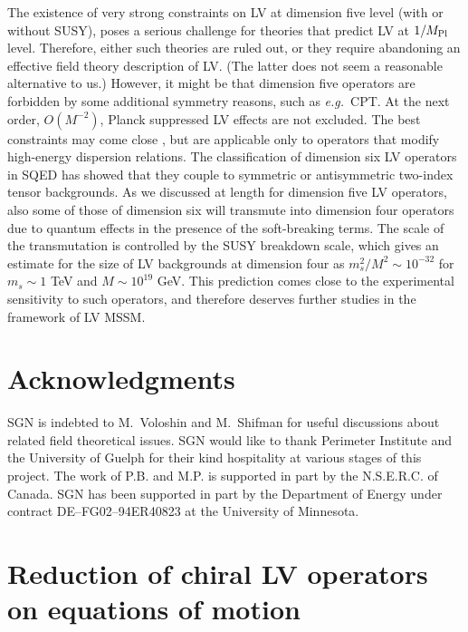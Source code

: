 \documentclass[12pt]{revtex4}
\begin{document}
The existence of very strong constraints on LV at dimension five level
(with or without SUSY), poses a serious challenge for theories that
predict LV at $1/M_{\rm Pl}$ level. Therefore, either such theories are
ruled out, or they require abandoning an effective field theory
description of LV. (The latter does not seem a  reasonable alternative
to us.) However, it might be that dimension five operators are
forbidden by some additional symmetry reasons, such as {\em e.g.}\
CPT. At the next order, $O(M^{-2})$, Planck suppressed LV effects 
are not excluded. The best constraints may come close
\cite{Gagnon:2004xh},  but are applicable only to operators that
modify high-energy dispersion relations. The classification of
dimension six LV operators in SQED has showed that they  couple to
symmetric or antisymmetric two-index tensor backgrounds. 
As we discussed at length for dimension five LV operators, also some
of those of dimension six will transmute into dimension four operators
due to quantum effects in the presence of the soft-breaking
terms. The scale of the transmutation is controlled by the
SUSY breakdown scale, which gives an estimate for the size of  
LV backgrounds at dimension four as $m_s^2/M^2 \sim 10^{-32}$
for $m_s\sim1$ TeV and $M\sim 10^{19}$ GeV. This prediction 
comes close to the experimental sensitivity to such operators,
and therefore deserves further studies in the framework of LV MSSM. 



\section*{Acknowledgments}


SGN is indebted to M.\ Voloshin and M.\ Shifman for useful discussions
about related field theoretical issues. 
SGN would like to thank Perimeter Institute and the University of
Guelph for their kind hospitality at various stages of this project. 
The work of P.B. and M.P. is supported in part by the N.S.E.R.C. of Canada. SGN has been supported in part by the Department of Energy 
under contract DE--FG02--94ER40823 at the University of Minnesota.



\pagebreak
\appendix


\section{Reduction of chiral LV operators on equations of motion}
\label{app_reduction}
\end{document}
